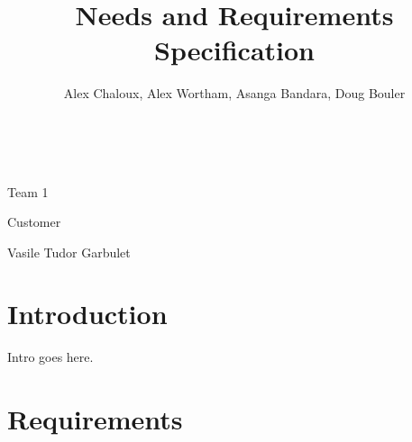 \documentclass[12pt,letterpaper]{article}
\author{Alex Chaloux, Alex Wortham, Asanga Bandara, Doug Bouler}
\title{Needs and Requirements Specification}
\newcommand{\team}{1}
\newcommand{\customer}{Vasile Tudor Garbulet}
\begin{document}
\makeatletter
~\vspace{1in}
\begin{center}
\vspace{1in}
{\LARGE \@title} \par\vspace{3ex}
{\large \@date} \par\vspace{3ex}
{\large Team \team} \par\vspace{1ex}
\@author \par\vspace{3ex}
{\large Customer} \par\vspace{1ex}
\customer
\end{center}
\makeatother
\thispagestyle{empty}
\newpage
\setcounter{page}{1}

\section*{Introduction}

Intro goes here.

\section*{Requirements}
\end{document}

